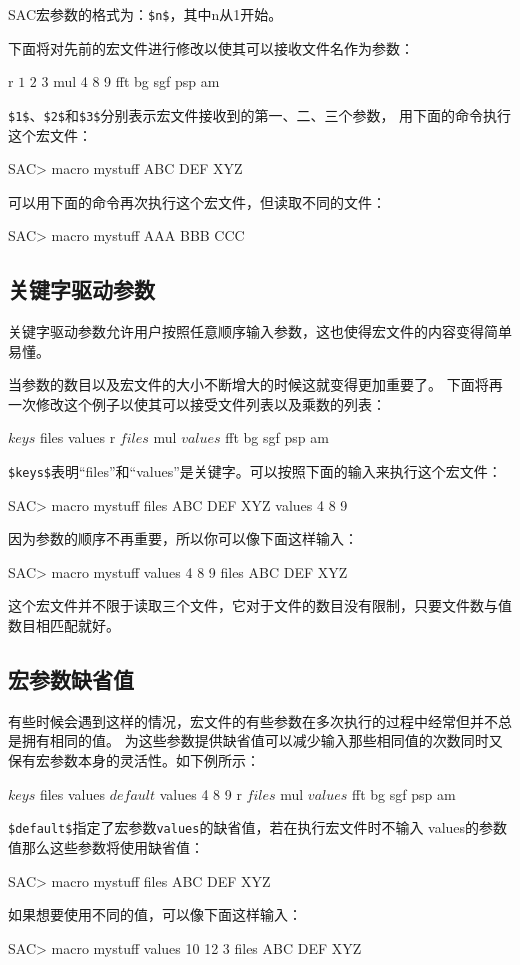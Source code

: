 SAC宏参数的格式为：\lstinline{$n$}，其中n从1开始。

下面将对先前的宏文件进行修改以使其可以接收文件名作为参数：
\begin{SACCode}
r $1$ $2$ $3$
mul 4 8 9
fft
bg sgf
psp am
\end{SACCode}
\lstinline{$1$}、\lstinline{$2$}和\lstinline{$3$}分别表示宏文件接收到的第一、二、三个参数，
用下面的命令执行这个宏文件：
\begin{SACCode}
SAC> macro mystuff ABC DEF XYZ 
\end{SACCode}

可以用下面的命令再次执行这个宏文件，但读取不同的文件：
\begin{SACCode}
SAC> macro mystuff AAA BBB CCC
\end{SACCode}

\subsection{关键字驱动参数}
关键字驱动参数允许用户按照任意顺序输入参数，这也使得宏文件的内容变得简单易懂。

当参数的数目以及宏文件的大小不断增大的时候这就变得更加重要了。
下面将再一次修改这个例子以使其可以接受文件列表以及乘数的列表：
\begin{SACCode}
$keys$ files values
r $files$
mul $values$
fft
bg sgf
psp am
\end{SACCode}
\lstinline{$keys$}表明``files''和``values''是关键字。可以按照下面的输入来执行这个宏文件：
\begin{SACCode}
SAC> macro mystuff files ABC DEF XYZ values 4 8 9
\end{SACCode}
因为参数的顺序不再重要，所以你可以像下面这样输入：
\begin{SACCode}
SAC> macro mystuff values 4 8 9 files ABC DEF XYZ
\end{SACCode}
这个宏文件并不限于读取三个文件，它对于文件的数目没有限制，只要文件数与值数目相匹配就好。

\subsection{宏参数缺省值}
有些时候会遇到这样的情况，宏文件的有些参数在多次执行的过程中经常但并不总是拥有相同的值。
为这些参数提供缺省值可以减少输入那些相同值的次数同时又保有宏参数本身的灵活性。如下例所示：
\begin{SACCode}
$keys$ files values
$default$ values 4 8 9
r $files$
mul $values$
fft
bg sgf
psp am
\end{SACCode}
\lstinline{$default$}指定了宏参数\lstinline{values}的缺省值，若在执行宏文件时不输入
values的参数值那么这些参数将使用缺省值：
\begin{SACCode}
SAC> macro mystuff files ABC DEF XYZ 
\end{SACCode}
如果想要使用不同的值，可以像下面这样输入：
\begin{SACCode}
SAC> macro mystuff values 10 12 3 files ABC DEF XYZ
\end{SACCode}

